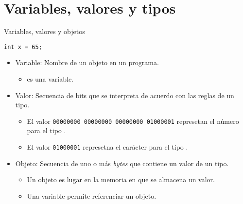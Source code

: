 \section{Variables, valores y tipos}

\begin{frame}[fragile]{Variables, valores y objetos}
\begin{lstlisting}
int x = 65;
\end{lstlisting}
\begin{itemize}
  \item \alert{Variable}: Nombre de un objeto en un programa.
    \begin{itemize}
      \item {} es una variable.
    \end{itemize}
  \item \alert{Valor}: Secuencia de bits que se interpreta de acuerdo con las reglas de un tipo.
    \begin{itemize}
      \item El valor \verb+00000000 00000000 00000000 01000001+ represetan el número  para el tipo .
      \item El valor \verb+01000001+ represetna el carácter  para el tipo .
    \end{itemize}
  \item \alert{Objeto}: Secuencia de uno o más \emph{bytes} que contiene un valor de un tipo.
    \begin{itemize}
      \item Un objeto es lugar en la memoria en que se almacena un valor.
      \item Una variable permite referenciar un objeto.
    \end{itemize}
\end{itemize}
\end{frame}

